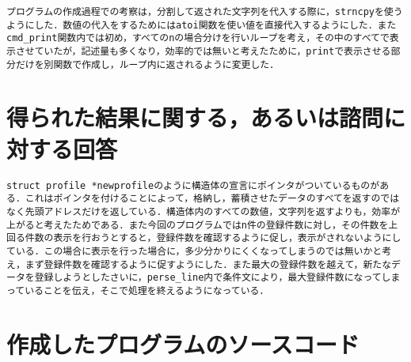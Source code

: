 \documentclass[a4j]{jarticle}
\begin{document}
\begin{verbatim}
プログラムの作成過程での考察は，分割して返された文字列を代入する際に，strncpyを使うようにした．数値の代入をするためにはatoi関数を使い値を直接代入するようにした．またcmd_print関数内では初め，すべてのnの場合分けを行いループを考え，その中のすべてで表示させていたが，記述量も多くなり，効率的では無いと考えたために，printで表示させる部分だけを別関数で作成し，ループ内に返されるように変更した．

\end{verbatim}

%
%

\section{得られた結果に関する，あるいは諮問に対する回答}

\begin{verbatim}
struct profile *newprofileのように構造体の宣言にポインタがついているものがある．これはポインタを付けることによって，格納し，蓄積させたデータのすべてを返すのではなく先頭アドレスだけを返している．構造体内のすべての数値，文字列を返すよりも，効率が上がると考えたためである．また今回のプログラムではn件の登録件数に対し，その件数を上回る件数の表示を行おうとすると，登録件数を確認するように促し，表示がされないようにしている．この場合に表示を行った場合に，多少分かりにくくなってしまうのでは無いかと考え，まず登録件数を確認するように促すようにした．また最大の登録件数を越えて，新たなデータを登録しようとしたさいに，perse_line内で条件文により，最大登録件数になってしまっていることを伝え，そこで処理を終えるようになっている．
\end{verbatim}

\newpage

%
%

\section{作成したプログラムのソースコード}




\end{document}
